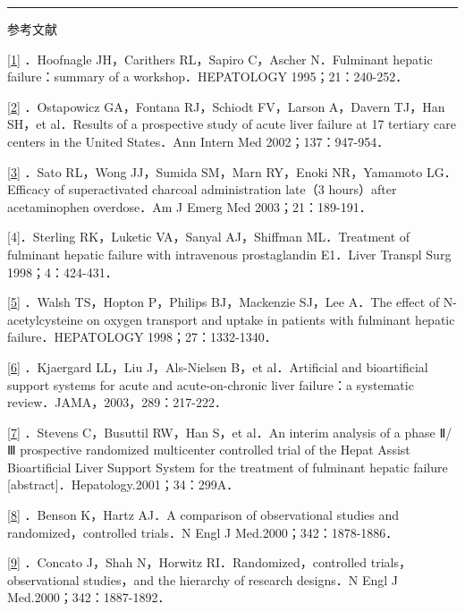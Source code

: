 \begin{center}\rule{0.5\linewidth}{\linethickness}\end{center}

参考文献

\protect\hyperlink{text00019.htmlux5cux23ch1-18-back}{{[}1{]}}
．Hoofnagle JH，Carithers RL，Sapiro C，Ascher N．Fulminant hepatic
failure：summary of a workshop．HEPATOLOGY 1995；21：240-252．

\protect\hyperlink{text00019.htmlux5cux23ch2-18-back}{{[}2{]}}
．Ostapowicz GA，Fontana RJ，Schiodt FV，Larson A，Davern TJ，Han SH，et
al．Results of a prospective study of acute liver failure at 17 tertiary
care centers in the United States．Ann Intern Med 2002；137：947-954．

\protect\hyperlink{text00019.htmlux5cux23ch3-18-back}{{[}3{]}} ．Sato
RL，Wong JJ，Sumida SM，Marn RY，Enoki NR，Yamamoto LG．Efficacy of
superactivated charcoal administration late（3 hours）after
acetaminophen overdose．Am J Emerg Med 2003；21：189-191．

{[}4{]}．Sterling RK，Luketic VA，Sanyal AJ，Shiffman ML．Treatment of
fulminant hepatic failure with intravenous prostaglandin E1．Liver
Transpl Surg 1998；4：424-431．

\protect\hyperlink{text00019.htmlux5cux23ch5-18-back}{{[}5{]}} ．Walsh
TS，Hopton P，Philips BJ，Mackenzie SJ，Lee A．The effect of
N-acetylcysteine on oxygen transport and uptake in patients with
fulminant hepatic failure．HEPATOLOGY 1998；27：1332-1340．

\protect\hyperlink{text00019.htmlux5cux23ch6-18-back}{{[}6{]}}
．Kjaergard LL，Liu J，Als-Nielsen B，et al．Artificial and
bioartificial support systems for acute and acute-on-chronic liver
failure：a systematic review．JAMA，2003，289：217-222．

\protect\hyperlink{text00019.htmlux5cux23ch7-18-back}{{[}7{]}} ．Stevens
C，Busuttil RW，Han S，et al．An interim analysis of a phase Ⅱ/Ⅲ
prospective randomized multicenter controlled trial of the Hepat Assist
Bioartificial Liver Support System for the treatment of fulminant
hepatic failure {[}abstract{]}．Hepatology.2001；34：299A．

\protect\hyperlink{text00019.htmlux5cux23ch8-18-back}{{[}8{]}} ．Benson
K，Hartz AJ．A comparison of observational studies and
randomized，controlled trials．N Engl J Med.2000；342：1878-1886．

\protect\hyperlink{text00019.htmlux5cux23ch9-18-back}{{[}9{]}} ．Concato
J，Shah N，Horwitz RI．Randomized，controlled trials，observational
studies，and the hierarchy of research designs．N Engl J
Med.2000；342：1887-1892．

